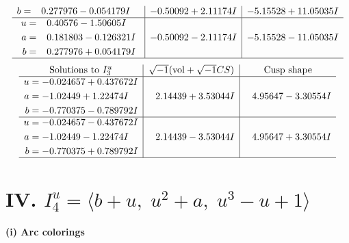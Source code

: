 \documentclass[1p]{elsarticle_modified}
\theoremstyle{definition}
\newcommand{\I}{\sqrt{-1}}
\begin{document}
$$\begin{array}{c|c|c}
\begin{aligned}
b &= \phantom{-}0.277976 - 0.054179 I\end{aligned}
 & -0.50092 + 2.11174 I & -5.15528 + 11.05035 I \\ \hline\begin{aligned}
u &= \phantom{-}0.40576 - 1.50605 I \\
a &= \phantom{-}0.181803 - 0.126321 I \\
b &= \phantom{-}0.277976 + 0.054179 I\end{aligned}
 & -0.50092 - 2.11174 I & -5.15528 - 11.05035 I\\
 \hline 
 \end{array}$$\newpage$$\begin{array}{c|c|c}  
\text{Solutions to }I^u_{3}& \I (\text{vol} + \sqrt{-1}CS) & \text{Cusp shape}\\
 \hline 
\begin{aligned}
u &= -0.024657 + 0.437672 I \\
a &= -1.02449 + 1.22474 I \\
b &= -0.770375 - 0.789792 I\end{aligned}
 & \phantom{-}2.14439 + 3.53044 I & \phantom{-}4.95647 - 3.30554 I \\ \hline\begin{aligned}
u &= -0.024657 - 0.437672 I \\
a &= -1.02449 - 1.22474 I \\
b &= -0.770375 + 0.789792 I\end{aligned}
 & \phantom{-}2.14439 - 3.53044 I & \phantom{-}4.95647 + 3.30554 I\\
 \hline 
 \end{array}$$\newpage\newpage\renewcommand{\arraystretch}{1}
\centering \section*{IV. $I^u_{4}= \langle b+u,\;u^2+a,\;u^3- u+1 \rangle$}
\flushleft \textbf{(i) Arc colorings}\\
\end{document}
